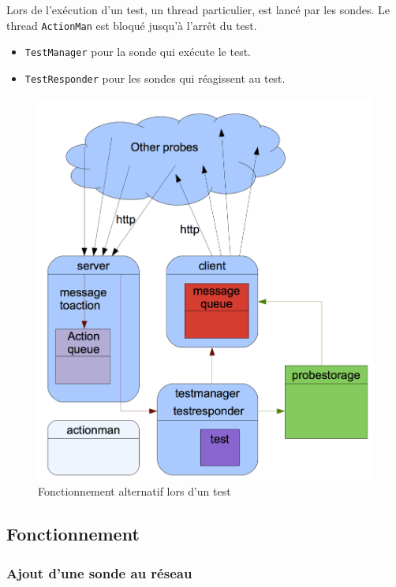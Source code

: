 \documentclass[a4paper,11pt]{article}
\newcommand{\cd}[1]{\texttt{#1}}
\begin{document}
Lors de l'exécution d'un test, un thread particulier, est lancé par les sondes. Le thread \cd{ActionMan} est bloqué jusqu'à l'arrêt du test.
\begin{itemize}
\item \cd{TestManager} pour la sonde qui exécute le test.
\item \cd{TestResponder} pour les sondes qui réagissent au test.
\end{itemize}

\begin{figure}[!ht]
\centering\includegraphics[width=\linewidth]{img/graphTest.png}
\caption{Fonctionnement alternatif lors d'un test}
\end{figure}

\FloatBarrier


\subsection{Fonctionnement}

\subsubsection{Ajout d'une sonde au réseau}
\end{document}
